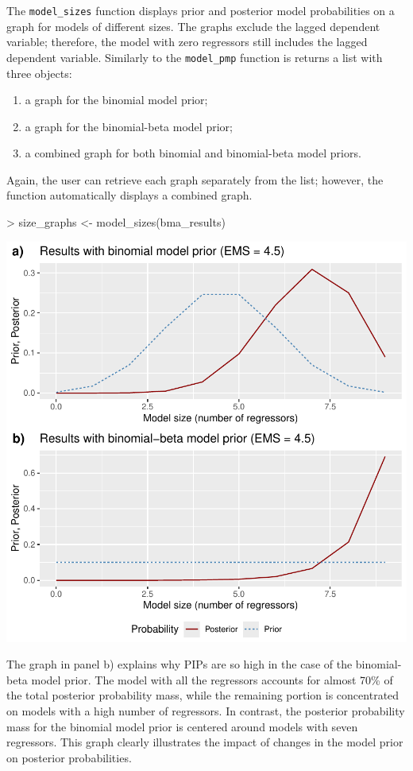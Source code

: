 \documentclass[a4paper]{article}
\begin{document}
The \verb+model_sizes+ function displays prior and posterior model probabilities on a graph for models of different sizes.
The graphs exclude the lagged dependent variable; therefore, the model with zero regressors still includes the lagged dependent variable.
Similarly to the \verb+model_pmp+ function is returns a list with three objects:
\begin{enumerate}
    \item a graph for the binomial model prior;
    \item a graph for the binomial-beta model prior;
    \item a combined graph for both binomial and binomial-beta model priors.
\end{enumerate}
Again, the user can retrieve each graph separately from the list; however, the function automatically displays a combined graph.
\begin{Schunk}
\begin{Sinput}
> size_graphs <- model_sizes(bma_results)
\end{Sinput}
\end{Schunk}
\includegraphics{bdsm_vignette-016}

The graph in panel b) explains why PIPs are so high in the case of the binomial-beta model prior.
The model with all the regressors accounts for almost 70\% of the total posterior probability mass, while the remaining portion is concentrated on models with a high number of regressors.
In contrast, the posterior probability mass for the binomial model prior is centered around models with seven regressors.
This graph clearly illustrates the impact of changes in the model prior on posterior probabilities.
\end{document}
